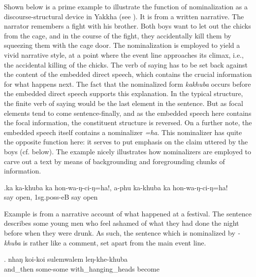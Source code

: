 Shown below is a prime example to illustrate the function of  nominalization as a discourse-structural device in Yakkha (see \Next). It  is from a written narrative. The narrator remembers a fight with his brother. Both boys want to let out the chicks from the cage, and in the course of the fight, they accidentally kill them by squeezing them with the cage door.  The nominalization is employed to yield a vivid narrative style, at a point where the event line approaches its climax, i.e., the accidental killing of the chicks. The verb of saying has to be set back against the content of the embedded direct speech, which contains the crucial information for what happens next. The fact that the nominalized form \emph{kakhuba}  occurs before the embedded direct speech supports this explanation. In the typical structure, the finite verb of saying would be the last element in the sentence. But as focal elements tend to come sentence-finally, and as the embedded speech here contains the focal information, the constituent structure is reversed.  On a further note, the embedded speech itself contains a nominalizer  \emph{=ha}. This nominalizer has quite the opposite function here: it serves to put emphasis on the claim uttered by the boys (cf.  below).  The example nicely illustrates how nominalizers are employed to carve out a text by means of backgrounding and foregrounding chunks of information.
	
	
	\exg.ka  ka-khuba ka  hon-wa-ŋ-ci-ŋ=ha!, a-phu ka-khuba ka   hon-wa-ŋ-ci-ŋ=ha!\\
	  say  open, {\sc 1sg.poss-}eB  say  open\\
	 
	
	
Example \Next is from a narrative account of what happened at a festival. The sentence describes some young men who feel ashamed of what they had done the night before when they were drunk. As such, the sentence which is nominalized by  \emph{-khuba} is rather like a comment, set apart from the main event line. 

	\exg. nhaŋ  koi-koi sulemwalem leŋ-khe-khuba\\
	and\_then some-some with\_hanging\_heads become\\
	 


